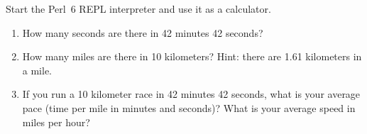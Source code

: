\begin{exercise}

Start the Perl~6 REPL interpreter and use it as a calculator.

\begin{enumerate}

\item How many seconds are there in 42 minutes 42 seconds?

\item How many miles are there in 10 kilometers?  Hint: there are 1.61
  kilometers in a mile.

\item If you run a 10 kilometer race in 42 minutes 42 seconds, what is
  your average pace (time per mile in minutes and seconds)?  What is
  your average speed in miles per hour?


\end{enumerate}

\end{exercise}


